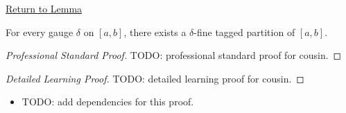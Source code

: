 \newpage
{}
\label{prf:cousin}
\begin{remark*}[Return]\hyperref[lem:cousin]{Return to Lemma}\end{remark*}

\begin{lemma*}
For every gauge \(\delta\) on \([a,b]\), there exists a \(\delta\)-fine tagged
partition of \([a,b]\).
\end{lemma*}

\begin{proof}[Professional Standard Proof]
\LRAProofBodyStart
TODO: professional standard proof for cousin.
\end{proof}

\begin{proof}[Detailed Learning Proof]
\LRAProofBodyStart
TODO: detailed learning proof for cousin.
\end{proof}

\begin{remark*}
\end{remark*}

\begin{dependencies}
\begin{itemize}
  \item TODO: add dependencies for this proof.
\end{itemize}
\end{dependencies}

\clearpage
